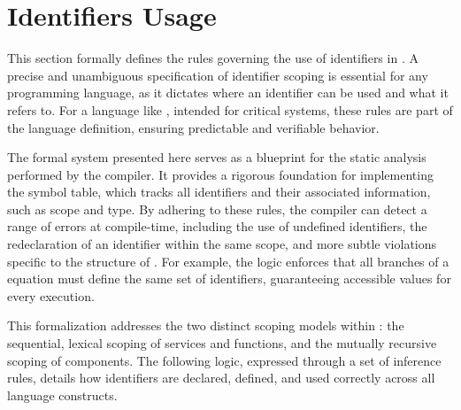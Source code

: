 \section{Identifiers Usage}
\label{sec:grust:id_usage}

This section formally defines the rules governing the use of identifiers in \GRust. A precise and
unambiguous specification of identifier scoping is essential for any programming language, as it
dictates where an identifier can be used and what it refers to. For a language like \GRust, intended
for critical systems, these rules are part of the language definition, ensuring predictable and
verifiable behavior.

The formal system presented here serves as a blueprint for the static analysis performed by the
compiler. It provides a rigorous foundation for implementing the symbol table, which tracks all
identifiers and their associated information, such as scope and type. By adhering to these rules,
the compiler can detect a range of errors at compile-time, including the use of undefined
identifiers, the redeclaration of an identifier within the same scope, and more subtle violations
specific to the structure of \GRust. For example, the logic enforces that all branches of a
 equation must define the same set of identifiers, guaranteeing accessible values for
every execution.

This formalization addresses the two distinct scoping models within \GRust: the sequential, lexical
scoping of \GRFRP services and functions, and the mutually recursive scoping of \GRSync components.
The following logic, expressed through a set of inference rules, details how identifiers are
declared, defined, and used correctly across all language constructs.

